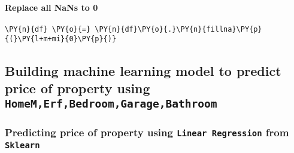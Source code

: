     \hypertarget{replace-all-nans-to-0}{%
\paragraph{Replace all NaNs to 0}\label{replace-all-nans-to-0}}

    \begin{tcolorbox}[breakable, size=fbox, boxrule=1pt, pad at break*=1mm,colback=cellbackground, colframe=cellborder]
\begin{Verbatim}[commandchars=\\\{\}]
\PY{n}{df} \PY{o}{=} \PY{n}{df}\PY{o}{.}\PY{n}{fillna}\PY{p}{(}\PY{l+m+mi}{0}\PY{p}{)}
\end{Verbatim}
\end{tcolorbox}

    \hypertarget{building-machine-learning-model-to-predict-price-of-property-using-homemerfbedroomgaragebathroom}{%
\subsection{\texorpdfstring{Building machine learning model to predict
price of property using
\texttt{HomeM,Erf,Bedroom,Garage,Bathroom}}{Building machine learning model to predict price of property using HomeM,Erf,Bedroom,Garage,Bathroom}}\label{building-machine-learning-model-to-predict-price-of-property-using-homemerfbedroomgaragebathroom}}

    \hypertarget{predicting-price-of-220-8th-avenue-property-using-linear-regression-from-sklearn}{%
\subsubsection{\texorpdfstring{Predicting price of property using \texttt{Linear\ Regression} from
\texttt{Sklearn}}{Predicting price of a property using Linear Regression from Sklearn}}\label{predicting-price-of-220-8th-avenue-property-using-linear-regression-from-sklearn}}

